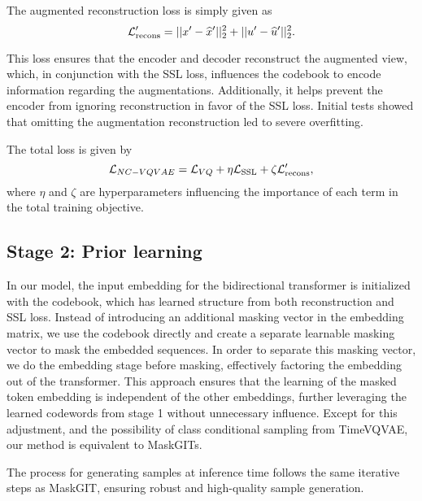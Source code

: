 \documentclass[../../thesis.tex]{subfiles}
\begin{document}
The augmented reconstruction loss is simply given as 
\begin{equation}
    \label{eq:NCVQVAE_augrecons}
        \mathcal{L}_\text{recons}' = ||x' - \widehat{x}' ||_2^2 + ||u' - \widehat{u}'||_2^2.
\end{equation}

This loss ensures that the encoder and decoder reconstruct the augmented view, which, in conjunction with the SSL loss, influences the codebook to encode information regarding the augmentations. Additionally, it helps prevent the encoder from ignoring reconstruction in favor of the SSL loss. Initial tests showed that omitting the augmentation reconstruction led to severe overfitting.\newline

The total loss is given by 
\begin{equation}
    \mathcal{L}_{NC-VQVAE} = \mathcal{L}_{VQ} + \eta\mathcal{L}_{\text{SSL}} + \zeta \mathcal{L}_\text{recons}',
\end{equation}
where $\eta$ and $\zeta$ are hyperparameters influencing the importance of each term in the total training objective.


\subsection{Stage 2: Prior learning}

In our model, the input embedding for the bidirectional transformer is initialized with the codebook, which has learned structure from both reconstruction and SSL loss. Instead of introducing an additional masking vector in the embedding matrix, we use the codebook directly and create a separate learnable masking vector to mask the embedded sequences. In order to separate this masking vector, we do the embedding stage before masking, effectively factoring the embedding out of the transformer. This approach ensures that the learning of the masked token embedding is independent of the other embeddings, further leveraging the learned codewords from stage 1 without unnecessary influence. Except for this adjustment, and the possibility of class conditional sampling from TimeVQVAE, our method is equivalent to MaskGITs.
\newline

The process for generating samples at inference time follows the same iterative steps as MaskGIT, ensuring robust and high-quality sample generation.
\end{document}
